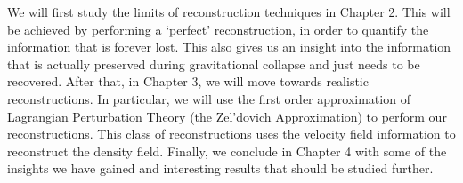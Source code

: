 We will first study the limits of reconstruction techniques in Chapter 2. This will be achieved by performing a `perfect' reconstruction, in order to quantify the information that is forever lost. This also gives us an insight into the information that is actually preserved during gravitational collapse and just needs to be recovered. After that, in Chapter 3, we will move towards realistic reconstructions. In particular, we will use the first order approximation of Lagrangian Perturbation Theory (the Zel'dovich Approximation) to perform our reconstructions. This class of reconstructions uses the velocity field information to reconstruct the density field. Finally, we conclude in Chapter 4 with some of the insights we have gained and interesting results that should be studied further.


